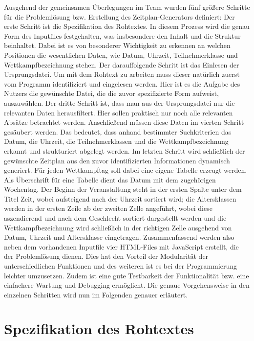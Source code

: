 {Ausgehend der gemeinsamen Überlegungen im Team wurden fünf größere Schritte für die Problemlösung bzw. Erstellung des Zeitplan-Generators definiert: Der erste Schritt ist die Spezifikation des Rohtextes. In diesem Prozess wird die genau Form des Inputfiles festgehalten, was insbesondere den Inhalt und die Struktur beinhaltet. Dabei ist es von besonderer Wichtigkeit zu erkennen an welchen Positionen die wesentlichen Daten, wie Datum, Uhrzeit, Teilnehmerklasse und Wettkampfbezeichnung stehen. Der darauffolgende Schritt ist das Einlesen der Ursprungsdatei. Um mit dem Rohtext zu arbeiten muss dieser natürlich zuerst vom Programm identifiziert und eingelesen werden. Hier ist es die Aufgabe des Nutzers die gewünschte Datei, die die zuvor spezifizierte Form aufweist, auszuwählen. Der dritte Schritt ist, dass man aus der Ursprungsdatei nur die relevanten Daten herausfiltert. Hier sollen praktisch nur noch alle relevanten Absätze betrachtet werden. Anschließend müssen diese Daten im vierten Schritt gesäubert werden. Das bedeutet, dass anhand bestimmter Suchkriterien das Datum, die Uhrzeit, die Teilnehmerklassen und die Wettkampfbezeichnung erkannt und strukturiert abgelegt werden. Im letzten Schritt wird schließlich der gewünschte Zeitplan aus den zuvor identifizierten Informationen dynamisch generiert. Für jeden Wettkampftag soll dabei eine eigene Tabelle erzeugt werden. Als Überschrift für eine Tabelle dient das Datum mit dem zugehörigen Wochentag. Der Beginn der Veranstaltung steht in der ersten Spalte unter dem Titel Zeit, wobei aufsteigend nach der Uhrzeit sortiert wird; die Altersklassen werden in der ersten Zeile ab der zweiten Zelle angeführt, wobei diese aszendierend und nach dem Geschlecht sortiert dargestellt werden und die Wettkampfbezeichnung wird schließlich in der richtigen Zelle ausgehend von Datum, Uhrzeit und Altersklasse eingetragen. 
Zusammenfassend werden also neben dem vorhandenen Inputfile vier HTML-Files mit JavaScript erstellt, die der Problemlösung dienen. Dies hat den Vorteil der Modularität der unterschiedlichen Funktionen und des weiteren ist es bei der Programmierung leichter umzusetzen. Zudem ist eine gute Testbarkeit der Funktionalität bzw. eine einfachere Wartung  und Debugging ermöglicht. Die genaue Vorgehensweise in den einzelnen Schritten wird nun im Folgenden genauer erläutert.

\section{Spezifikation des Rohtextes}

}
